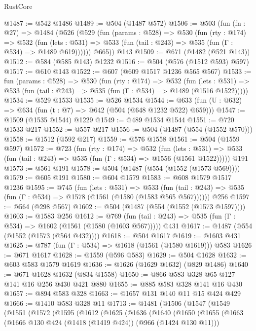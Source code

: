 \begin{lexlean}{RustCore}
\begin{coremodule}
@1487 := @542 @1486
@1489 := @504 (@1487 @572)
@1506 := @503
    (fun (fn : @27) =>
    @1484
      (@526
        (@529
          (fun (params : @528) =>
          @530
            (fun (rty : @174) =>
            @532
              (fun (lets : @531) =>
              @533 (fun (tail : @243) => @535 (fun (Γ : @534) => @1489 @619))))))
        @665))
    @143
@1509 := @671 (@1482 (@521 @143))
@1512 := @584 (@585 @143) @1232
@1516 := @504 (@576 (@1512 @593) @597)
@1517 := @610 @143
@1522 := @607 (@609 @1517 @1236 @565 @567)
@1533 := fun (params : @528) =>
  @530
    (fun (rty : @174) =>
    @532
      (fun (lets : @531) =>
      @533 (fun (tail : @243) => @535 (fun (Γ : @534) => @1489 (@1516 @1522)))))
@1534 := @529 @1533
@1535 := @526 @1534
@1544 := @633 (fun (U : @632) => @634 (fun (t : @7) => @642 (@504 (@648 @1232 @522) @659)))
@1547 := @1509 (@1535 @1544) @1229
@1549 := @489 @1534 @1544
@1551 := @720 @1533 @217
@1552 := @557 @217
@1556 := @504 (@1487 (@554 (@1552 @570)))
@1558 := @1512 (@592 @217)
@1559 := @576 @1558
@1561 := @504 (@1559 @597)
@1572 := @723
    (fun (rty : @174) =>
    @532
      (fun (lets : @531) =>
      @533 (fun (tail : @243) => @535 (fun (Γ : @534) => @1556 (@1561 @1522)))))
    @191
@1573 := @561 @191
@1578 := @504 (@1487 (@554 (@1552 (@1573 @569))))
@1579 := @605 @191
@1580 := @604 @1579
@1583 := @608 @1579 @1517 @1236
@1595 := @745
    (fun (lets : @531) =>
    @533 (fun (tail : @243) => @535 (fun (Γ : @534) => @1578 (@1561 (@1580 (@1583 @565 @567))))))
    @256
@1597 := @564 (@298 @567)
@1602 := @504 (@1487 (@554 (@1552 (@1573 @1597))))
@1603 := @1583 @256
@1612 := @769
    (fun (tail : @243) => @535 (fun (Γ : @534) => @1602 (@1561 (@1580 (@1603 @567)))))
    @431
@1617 := @1487 (@554 (@1552 (@1573 (@564 @432))))
@1618 := @504 @1617
@1619 := @1603 @431
@1625 := @787 (fun (Γ : @534) => @1618 (@1561 (@1580 @1619))) @583
@1626 := @671 @1617
@1628 := @1559 (@596 @583)
@1629 := @504 @1628
@1632 := @603 @583 @1579 @1619
@1636 := @1626 (@1629 @1632) (@829 @1486)
@1640 := @671 @1628 @1632 (@834 @1558)
@1650 := @866 @583 @328 @65 @127 @141 @16 @256 @430 @421 @880
@1655 := @885 @583 @328 @141 @16 @430
@1657 := @894 @583 @328
@1663 := @1657 @131 @140 @11 @15 @424 @429
@1666 := @1410 @583 @328 @11
@1713 := @1481
    (@1506
      (@1547
        (@1549
          (@1551
            (@1572
              (@1595
                (@1612
                  (@1625
                    (@1636
                      (@1640
                        (@1650
                          (@1655
                            (@1663
                              (@1666 @130 @424 (@1418 (@1419 @424)) (@966 (@1424 @130 @11)))

\end{coremodule}
\end{lexlean}
